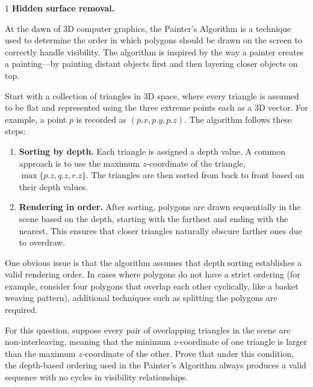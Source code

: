 \documentclass[12pt]{article}
\begin{document}


\begin{problem}{1}
    \textbf{Hidden surface removal.}

    At the dawn of 3D computer graphics, the Painter’s Algorithm is a technique used to determine the order in which polygons should be drawn on the screen to correctly handle visibility. The algorithm is inspired by the way a painter creates a painting—by painting distant objects first and then layering closer objects on top.

    Start with a collection of triangles in 3D space, where every triangle is assumed to be flat and represented using the three extreme points each as a 3D vector. For example, a point $p$ is recorded as $(p.x, p.y, p.z)$. The algorithm follows these steps:

    \begin{enumerate}
        \item \textbf{Sorting by depth.} Each triangle is assigned a depth value. A common approach is to use the maximum $z$-coordinate of the triangle, $\max\{p.z, q.z, r.z\}$. The triangles are then sorted from back to front based on their depth values.
        
        \item \textbf{Rendering in order.} After sorting, polygons are drawn sequentially in the scene based on the depth, starting with the farthest and ending with the nearest. This ensures that closer triangles naturally obscure farther ones due to overdraw.
    \end{enumerate}

    One obvious issue is that the algorithm assumes that depth sorting establishes a valid rendering order. In cases where polygons do not have a strict ordering (for example, consider four polygons that overlap each other cyclically, like a basket weaving pattern), additional techniques such as splitting the polygons are required.

    For this question, suppose every pair of overlapping triangles in the scene are non-interleaving, meaning that the minimum $z$-coordinate of one triangle is larger than the maximum $z$-coordinate of the other. Prove that under this condition, the depth-based ordering used in the Painter’s Algorithm always produces a valid sequence with no cycles in visibility relationships.
\end{problem}
\end{document}
